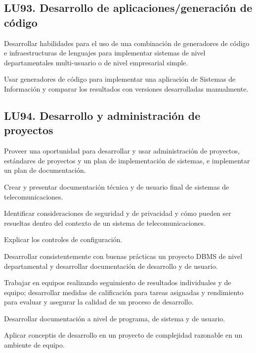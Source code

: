 \subsection{LU93. Desarrollo de aplicaciones/generación de código}\label{sec:LU93}
\begin{LearningUnit}
\begin{LUGoal}
\item Desarrollar habilidades para el uso de una combinación de generadores de código e infraestructuras de lenguajes para implementar sistemas de nivel departamentales multi-usuario o de nivel empresarial simple.
\end{LUGoal}

\begin{LUObjective}
\item Usar generadores de código para implementar una aplicación de Sistemas de Información y comparar los resultados con versiones desarrolladas manualmente.
\end{LUObjective}
\end{LearningUnit}

\subsection{LU94. Desarrollo y administración de proyectos}\label{sec:LU94}
\begin{LearningUnit}
\begin{LUGoal}
\item Proveer una oportunidad para desarrollar y usar administración de proyectos, estándares de proyectos y un plan de implementación de sistemas, e implementar un plan de documentación.
\end{LUGoal}

\begin{LUObjective}
\item Crear y presentar documentación técnica y de usuario final de sistemas de telecomunicaciones.
\item Identificar consideraciones de seguridad y de privacidad y cómo pueden ser resueltas dentro del contexto de un sistema de telecomunicaciones.
\item Explicar los controles de configuración.
\item Desarrollar consistentemente con buenas prácticas un proyecto DBMS de nivel departamental y desarrollar documentación de desarrollo y de usuario.
\item Trabajar en equipos realizando seguimiento de resultados individuales y de equipo; desarrollar medidas de calificación para tareas asignadas y rendimiento para evaluar y asegurar la calidad de un proceso de desarrollo.
\item Desarrollar documentación a nivel de programa, de sistema y de usuario.
\item Aplicar conceptis de desarrollo en un proyecto de complejidad razonable en un ambiente de equipo.
\end{LUObjective}
\end{LearningUnit}

